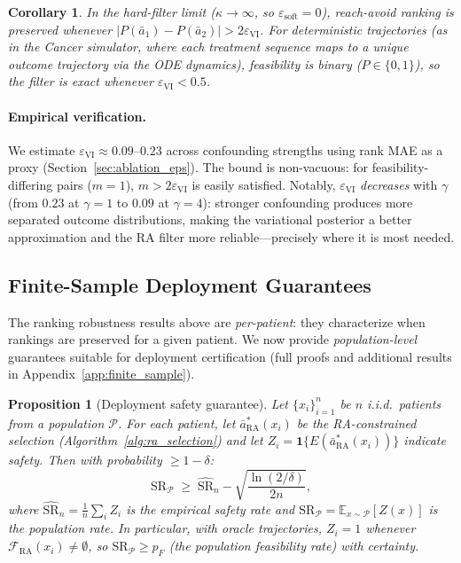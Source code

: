 \documentclass{article}
\newtheorem{proposition}[theorem]{Proposition}
\newtheorem{corollary}[theorem]{Corollary}
\newcommand{\E}{\mathbb{E}}
\newcommand{\ba}{\bar{a}}
\newcommand{\cF}{\mathcal{F}}
\newcommand{\ind}{\mathbf{1}}
\newcommand{\cP}{\mathcal{P}}
\begin{document}
\begin{corollary}
\label{cor:hard_filter_exact}
In the hard-filter limit ($\kappa \to \infty$, so $\varepsilon_{\mathrm{soft}} = 0$), reach-avoid ranking is preserved whenever $|P(\ba_1) - P(\ba_2)| > 2\varepsilon_{\mathrm{VI}}$. For deterministic trajectories (as in the Cancer simulator, where each treatment sequence maps to a unique outcome trajectory via the ODE dynamics), feasibility is binary ($P \in \{0, 1\}$), so the filter is exact whenever $\varepsilon_{\mathrm{VI}} < 0.5$.
\end{corollary}

\vspace{-0.8em}
\paragraph{Empirical verification.} We estimate $\varepsilon_{\mathrm{VI}} \approx 0.09$--$0.23$ across confounding strengths using rank MAE as a proxy (Section~\ref{sec:ablation_eps}). The bound is non-vacuous: for feasibility-differing pairs ($m = 1$), $m > 2\varepsilon_{\mathrm{VI}}$ is easily satisfied. Notably, $\varepsilon_{\mathrm{VI}}$ \emph{decreases} with $\gamma$ (from $0.23$ at $\gamma = 1$ to $0.09$ at $\gamma = 4$): stronger confounding produces more separated outcome distributions, making the variational posterior a better approximation and the RA filter more reliable---precisely where it is most needed.

\subsection{Finite-Sample Deployment Guarantees}
\label{sec:finite_sample}

The ranking robustness results above are \emph{per-patient}: they characterize when rankings are preserved for a given patient. We now provide \emph{population-level} guarantees suitable for deployment certification (full proofs and additional results in Appendix~\ref{app:finite_sample}).

\begin{proposition}[Deployment safety guarantee]
\label{prop:deployment}
Let $\{x_i\}_{i=1}^n$ be $n$ i.i.d.\ patients from a population $\cP$. For each patient, let $\ba^*_{\mathrm{RA}}(x_i)$ be the RA-constrained selection (Algorithm~\ref{alg:ra_selection}) and let $Z_i = \ind\{E(\ba^*_{\mathrm{RA}}(x_i))\}$ indicate safety. Then with probability $\geq 1 - \delta$:
\begin{equation}
\label{eq:deployment_bound}
\mathrm{SR}_\cP \;\geq\; \widehat{\mathrm{SR}}_n - \sqrt{\frac{\ln(2/\delta)}{2n}},
\end{equation}
where $\widehat{\mathrm{SR}}_n = \frac{1}{n}\sum_i Z_i$ is the empirical safety rate and $\mathrm{SR}_\cP = \E_{x \sim \cP}[Z(x)]$ is the population rate. In particular, with oracle trajectories, $Z_i = 1$ whenever $\cF_{\mathrm{RA}}(x_i) \neq \emptyset$, so $\mathrm{SR}_\cP \geq p_F$ (the population feasibility rate) with certainty.
\end{proposition}
\end{document}
